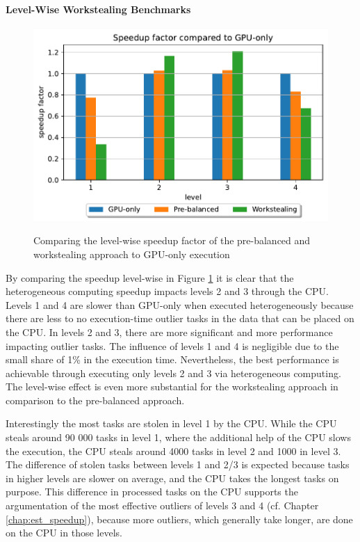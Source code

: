 \paragraph{Level-Wise Workstealing Benchmarks}
\begin{figure}[H]
  \caption{Comparing the level-wise speedup factor of the pre-balanced and workstealing approach to GPU-only execution}
  \includegraphics[width=\textwidth]{figures/levelwise.pdf}
  \centering
  \label{fig:levelwise_delos}
\end{figure}

By comparing the speedup level-wise in Figure \ref{fig:levelwise_delos} it is clear that the heterogeneous computing speedup impacts levels 2 and 3 through the CPU. Levels 1 and 4 are slower than GPU-only when executed heterogeneously because there are less to no execution-time outlier tasks in the data that can be placed on the CPU. In levels 2 and 3, there are more significant and more performance impacting outlier tasks. The influence of levels 1 and 4 is negligible due to the small share of 1\% in the execution time. Nevertheless, the best performance is achievable through executing only levels 2 and 3 via heterogeneous computing. The level-wise effect is even more substantial for the workstealing approach in comparison to the pre-balanced approach.

Interestingly the most tasks are stolen in level 1 by the CPU. While the CPU steals around 90 000 tasks in level 1, where the additional help of the CPU slows the execution, the CPU steals around 4000 tasks in level 2 and 1000 in level 3. The difference of stolen tasks between levels 1 and 2/3 is expected because tasks in higher levels are slower on average, and the CPU takes the longest tasks on purpose. This difference in processed tasks on the CPU supports the argumentation of the most effective outliers of levels 3 and 4 (cf. Chapter \ref{chap:est_speedup}), because more outliers, which generally take longer, are done on the CPU in those levels.

